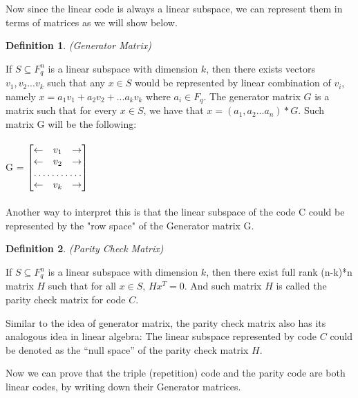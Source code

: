 \documentclass{article}
\newtheorem{Definition}{Definition}
\begin{document}
Now since the linear code is always a linear subspace, we can represent them in terms of matrices as we will show below.
\begin{Definition}(Generator Matrix)\end{Definition}
\noindent If $S \subseteq F_q^n$ is a linear subspace with dimension $k$, then there exists vectors $v_1, v_2...v_k$ such that any $x \in S$ would be represented by linear combination of $v_i$, namely $x = a_1v_1 + a_2v_2+ ... a_kv_k$ where $a_i \in F_q$. The generator matrix $G$ is a matrix such that for every $x \in S$, we have that $x = (a_1,a_2...a_n)*G$. Such matrix G will be the following: \\\\
G =
$\begin{bmatrix}
    \leftarrow       & v_1 & \rightarrow \\
    \leftarrow       & v_2 & \rightarrow \\
    \hdotsfor{3} \\
    \leftarrow       & v_k & \rightarrow
\end{bmatrix}$\\\\
Another way to interpret this is that the linear subspace of the code C could be represented by the "row space" of the Generator matrix G.
\begin{Definition}(Parity Check Matrix)\end{Definition}
\noindent If $S \subseteq F_q^n$ is a linear subspace with dimension $k$, then there exist full rank (n-k)*n matrix $H$ such that for all $x \in S$, $Hx^T = 0$. And such matrix $H$ is called the parity check matrix for code $C$.

Similar to the idea of generator matrix, the parity check matrix also has its analogous idea in linear algebra: The linear subspace represented by code $C$ could be denoted as the ``null space'' of the parity check matrix $H$.

Now we can prove that the triple (repetition) code and the parity code are both linear codes, by writing down their Generator matrices.
\end{document}
